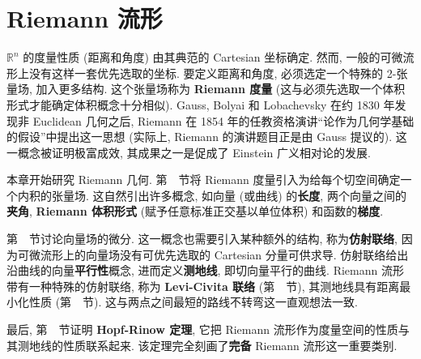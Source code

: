 \chapter{Riemann 流形}\label{chap:riemannian-manifolds}
\begingroup
\renewcommand{\thefootnote}{}
\endgroup

$\mathbb{R}^n$ 的度量性质 (距离和角度) 由其典范的 Cartesian 坐标确定. 然而, 一般的可微流形上没有这样一套优先选取的坐标. 要定义距离和角度, 必须选定一个特殊的 2-张量场, 加入更多结构. 这个张量场称为 \textbf{Riemann 度量} (这与必须先选取一个体积形式才能确定体积概念十分相似). Gauss, Bolyai 和 Lobachevsky 在约 1830 年发现非 Euclidean 几何之后, Riemann 在 1854 年的任教资格演讲\textquotedblleft 论作为几何学基础的假设\textquotedblright 中提出这一思想 (实际上, Riemann 的演讲题目正是由 Gauss 提议的). 这一概念被证明极富成效, 其成果之一是促成了 Einstein 广义相对论的发展.

本章开始研究 Riemann 几何. 第~~节将 Riemann 度量引入为给每个切空间确定一个内积的张量场. 这自然引出许多概念, 如向量 (或曲线) 的\textbf{长度}, 两个向量之间的\textbf{夹角}, \textbf{Riemann 体积形式} (赋予任意标准正交基以单位体积) 和函数的\textbf{梯度}.

第~~节讨论向量场的微分. 这一概念也需要引入某种额外的结构, 称为\textbf{仿射联络}, 因为可微流形上的向量场没有可优先选取的 Cartesian 分量可供求导. 仿射联络给出沿曲线的向量\textbf{平行性}概念, 进而定义\textbf{测地线}, 即切向量平行的曲线. Riemann 流形带有一种特殊的仿射联络, 称为 \textbf{Levi-Civita 联络} (第~~节), 其测地线具有距离最小化性质 (第~~节). 这与两点之间最短的路线不转弯这一直观想法一致.

最后, 第~~节证明 \textbf{Hopf-Rinow 定理}, 它把 Riemann 流形作为度量空间的性质与其测地线的性质联系起来. 该定理完全刻画了\textbf{完备} Riemann 流形这一重要类别.
